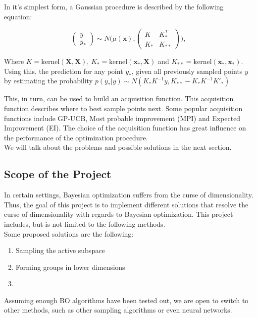 \documentclass{NSF}
\begin{document}
In it's simplest form, a Gaussian procedure is described by the following equation:

\begin{equation}
\begin{pmatrix} y \\
y_* \end{pmatrix} \sim N\Biggl(\mu(\mathbf{x}),\begin{pmatrix} K & K^T_*\\
 K_* & K_{**} \end{pmatrix}\Biggr),
\end{equation}

Where $K = \text{kernel}(\mathbf{X}, \mathbf{X})$, $K_* = \text{kernel}(\mathbf{x_*}, \mathbf{X})$ and $K_{**} = \text{kernel}(\mathbf{x_*}, \mathbf{x_*})$.
Using this, the prediction for any point $y_*$, given all previously sampled points $y$ by estimating the probability $ p(y_*|y) \sim N(K_*K^{-1}y,K_{**}-K_*K^{-1}K'_*) $

This, in turn, can be used to build an acquisition function. 
This acquisition function describes where to best sample points next.
Some popular acquisition functions include GP-UCB, Most probable improvement (MPI) and Expected Improvement (EI).
The choice of the acquisition function has great influence on the performance of the optimization procedure.\\

We will talk about the problems and possible solutions in the next section.

\subsection{Scope of the Project}

In certain settings, Bayesian optimization suffers from the curse of dimensionality. 
Thus, the goal of this project is to implement different solutions that resolve the curse of dimensionality with regards to Bayesian optimization.
This project includes, but is not limited to the following methods.\\

Some proposed solutions are the following:

\begin{enumerate}
\item Sampling the active subspace 
\item Forming groups in lower dimensions
\item 
\end{enumerate}

Assuming enough BO algorithms have been tested out, we are open to switch to other methods, such as other sampling algorithms or even neural networks.




\renewcommand\refname{References}


\end{document}
